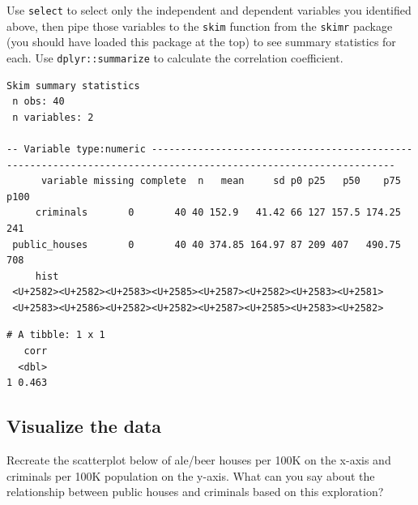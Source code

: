 \documentclass[]{article}
\newenvironment{Shaded}{\begin{snugshade}}{\end{snugshade}}
\newcommand{\DataTypeTok}[1]{\textcolor[rgb]{0.13,0.29,0.53}{#1}}
\newcommand{\KeywordTok}[1]{\textcolor[rgb]{0.13,0.29,0.53}{\textbf{#1}}}
\newcommand{\NormalTok}[1]{#1}
\newcommand{\OperatorTok}[1]{\textcolor[rgb]{0.81,0.36,0.00}{\textbf{#1}}}
\newcommand{\StringTok}[1]{\textcolor[rgb]{0.31,0.60,0.02}{#1}}
\begin{document}
Use \texttt{select} to select only the independent and dependent
variables you identified above, then pipe those variables to the
\texttt{skim} function from the \texttt{skimr} package (you should have
loaded this package at the top) to see summary statistics for each. Use
\texttt{dplyr::summarize} to calculate the correlation coefficient.

\begin{Shaded}
\end{Shaded}

\begin{verbatim}
Skim summary statistics
 n obs: 40 
 n variables: 2 

-- Variable type:numeric ----------------------------------------------------------------------------------------------------------------
      variable missing complete  n   mean     sd p0 p25   p50    p75 p100
     criminals       0       40 40 152.9   41.42 66 127 157.5 174.25  241
 public_houses       0       40 40 374.85 164.97 87 209 407   490.75  708
     hist
 <U+2582><U+2582><U+2583><U+2585><U+2587><U+2582><U+2583><U+2581>
 <U+2583><U+2586><U+2582><U+2582><U+2587><U+2585><U+2583><U+2582>
\end{verbatim}

\begin{Shaded}
\end{Shaded}

\begin{verbatim}
# A tibble: 1 x 1
   corr
  <dbl>
1 0.463
\end{verbatim}

\hypertarget{visualize-the-data}{%
\subsection{Visualize the data}\label{visualize-the-data}}

Recreate the scatterplot below of ale/beer houses per 100K on the x-axis
and criminals per 100K population on the y-axis. What can you say about
the relationship between public houses and criminals based on this
exploration?
\end{document}
